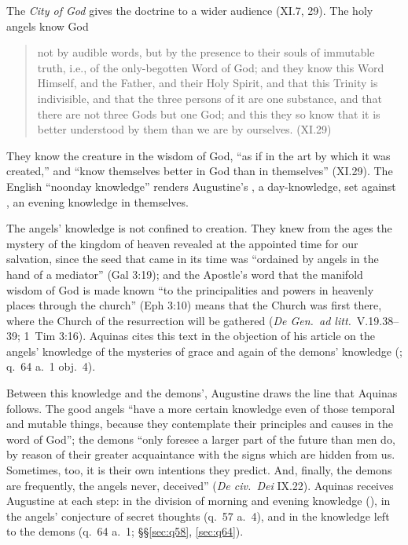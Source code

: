 The \emph{City of God} gives the doctrine to a wider audience (XI.7,
29). The holy angels know God
\begin{quote}
not by audible words, but by the presence to their souls of immutable
truth, i.e., of the only-begotten Word of God; and they know this Word
Himself, and the Father, and their Holy Spirit, and that this Trinity is
indivisible, and that the three persons of it are one substance, and that
there are not three Gods but one God; and this they so know that it is
better understood by them than we are by ourselves. (XI.29)
\end{quote}
They know the creature in the wisdom of God, ``as if in the art by which
it was created,'' and ``know themselves better in God than in themselves''
(XI.29). The English ``noonday knowledge'' renders
Augustine's , a day-knowledge, set
against , an evening
knowledge in themselves.

The angels' knowledge is not confined to creation. They knew from the ages
the mystery of the kingdom of heaven revealed at the appointed time for our
salvation, since the seed that came in its time was ``ordained by angels in
the hand of a mediator'' (Gal 3:19); and the Apostle's word that the
manifold wisdom of God is made known ``to the principalities and powers in
heavenly places through the church'' (Eph 3:10) means that the Church was
first there, where the Church of the resurrection will be gathered
(\emph{De Gen.\ ad litt.}\ V.19.38--39; 1~Tim 3:16). Aquinas cites
this text in the objection of his article on the angels' knowledge of the
mysteries of grace and again of the demons' knowledge (; q.~64 a.~1 obj.~4).

Between this knowledge and the demons', Augustine draws the line that
Aquinas follows. The good angels ``have a more certain knowledge even of those temporal and mutable
things, because they contemplate their principles and causes in the word
of God''; the demons ``only foresee a larger part of the future than men
do, by reason of their greater acquaintance with the signs which are
hidden from us. Sometimes, too, it is their own intentions they predict.
And, finally, the demons are frequently, the angels never, deceived''
(\emph{De civ.\ Dei} IX.22). Aquinas receives Augustine at each step:
in the division of morning and evening knowledge (),
in the angels' conjecture of secret thoughts (q.~57 a.~4), and in the
knowledge left to the demons (q.~64 a.~1; \S\S\ref{sec:q58},
\ref{sec:q64}).

